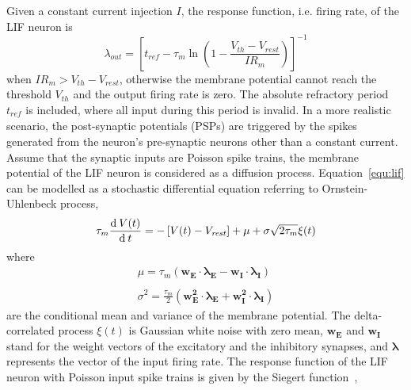 Given a constant current injection $I$, the response function, i.e. firing rate, of the LIF neuron is
\begin{equation}
\lambda_\mathit{out}=
\left [ t_\mathit{ref}-\tau_m\ln \left ( 1-\frac{V_{th}-V_\mathit{rest}}{IR_m}  \right )\right ]^{-1}
\label{equ:consI}
\end{equation}
when $IR_m>V_{th}-V_{rest}$, otherwise the membrane potential cannot reach the threshold $V_{th}$ and the output firing rate is zero. 
The absolute refractory period $t_\mathit{ref}$ is included, where all input during this period is invalid.
In a more realistic scenario, the post-synaptic potentials (PSPs) are triggered by the spikes generated from the neuron's pre-synaptic neurons other than a constant current.
Assume that the synaptic inputs are Poisson spike trains, the membrane potential of the LIF neuron is considered as a diffusion process. Equation~\ref{equ:lif} can be modelled as a stochastic differential equation referring to Ornstein-Uhlenbeck process,
\begin{equation}
\tau_m\frac{\mathrm{d}\:V(t)}{\mathrm{d}\:  t}=-\left[V(t)-V_\mathit{rest}\right] + \mu + \sigma\sqrt{2\tau_m}\xi (t)
\label{equ:sde}
\end{equation}
where
\begin{equation}
\begin{array}{l}
\mu=\tau_m(\mathbf{w_E\cdot\lambda_E}-\mathbf{w_I\cdot\lambda_I})
\\
\\
\sigma ^{2} = \frac{\tau_m}{2}\left(\mathbf{w_E^{2}\cdot\lambda_E}+\mathbf{w_I^{2}\cdot\lambda_I}\right)
\end{array}
\label{equ:ou}
\end{equation}
are the conditional mean and variance of the membrane potential.
The delta-correlated process $\xi(t)$ is Gaussian white noise with zero mean, $\mathbf{w_E}$ and $\mathbf{w_I}$ stand for the weight vectors of the excitatory and the inhibitory synapses, and $\mathbf{\lambda}$ represents the vector of the input firing rate.
The response function of the LIF neuron with Poisson input spike trains is given by the Siegert function~\cite{siegert1951first}, 
